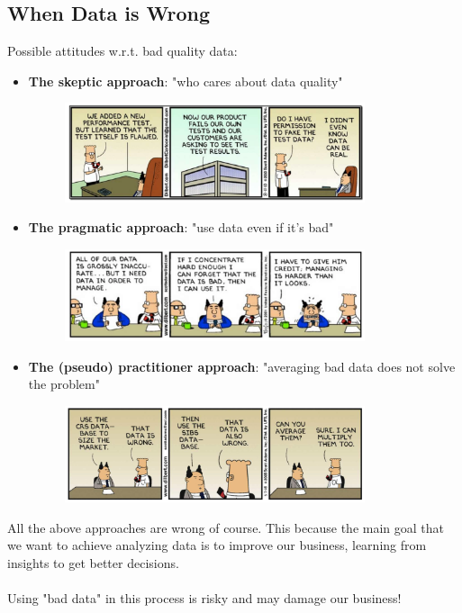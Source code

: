 \documentclass[10pt,a4paper]{article}
\newcommand{\nline}{\\~\\}
\begin{document}
\subsection{When Data is Wrong}
Possible attitudes w.r.t. bad quality data:
\begin{itemize}
	\item \textbf{The skeptic approach}: "who cares about data quality"
	 \begin{figure}[ht!]
 \hfill \includegraphics[width=250pt]{images/data-skeptic}
 \hspace*{\fill}
 \end{figure}
	\item \textbf{The pragmatic approach}: "use data even if it's bad"
	\begin{figure}[ht!]
 \hfill \includegraphics[width=250pt]{images/data-pragmatic}
 \hspace*{\fill}
 \end{figure}
	\item \textbf{The (pseudo) practitioner approach}: "averaging bad data does not solve the problem"
	\begin{figure}[ht!]
 \hfill \includegraphics[width=250pt]{images/data-practitioner}
 \hspace*{\fill}
 \end{figure}
\end{itemize}
All the above approaches are wrong of course. This because the main goal that we want to achieve analyzing data is to improve our business, learning from insights to get better decisions. \nline
Using "bad data" in this process is risky and may damage our business! 
\end{document}
